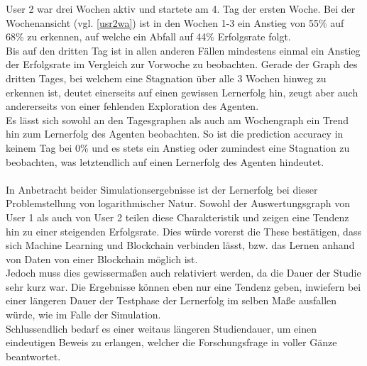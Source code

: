 User 2 war drei Wochen aktiv und startete am 4. Tag der ersten Woche.
Bei der Wochenansicht (vgl. \ref{usr2wa}) ist in den Wochen 1-3 ein Anstieg von 55\% auf 68\% zu erkennen, auf welche ein Abfall auf 44\% Erfolgsrate folgt. \\
Bis auf den dritten Tag ist in allen anderen Fällen mindestens einmal ein Anstieg der Erfolgsrate im Vergleich zur Vorwoche zu beobachten. Gerade der Graph des dritten Tages, bei welchem eine Stagnation über alle 3 Wochen hinweg zu erkennen ist, deutet einerseits auf einen gewissen Lernerfolg hin, zeugt aber auch andererseits von einer fehlenden Exploration des Agenten. \\
Es lässt sich sowohl an den Tagesgraphen als auch am Wochengraph ein Trend hin zum Lernerfolg des Agenten beobachten. So ist die prediction accuracy in keinem Tag bei 0\% und es stets ein Anstieg oder zumindest eine Stagnation zu beobachten, was letztendlich auf einen Lernerfolg des Agenten hindeutet.
\\\\
In Anbetracht beider Simulationsergebnisse ist der Lernerfolg bei dieser Problemstellung von logarithmischer Natur. Sowohl der Auswertungsgraph von User 1 als auch von User 2 teilen diese Charakteristik und zeigen eine Tendenz hin zu einer steigenden Erfolgsrate. Dies würde vorerst die These bestätigen, dass sich Machine Learning und Blockchain verbinden lässt, bzw. das Lernen anhand von Daten von einer Blockchain möglich ist. \\
Jedoch muss dies gewissermaßen auch relativiert werden, da die Dauer der Studie sehr kurz war. Die Ergebnisse können eben nur eine Tendenz geben, inwiefern bei einer längeren Dauer der Testphase der Lernerfolg im selben Maße ausfallen würde, wie im Falle der Simulation. \\
Schlussendlich bedarf es einer weitaus längeren Studiendauer, um einen eindeutigen Beweis zu erlangen, welcher die Forschungsfrage in voller Gänze beantwortet. 



